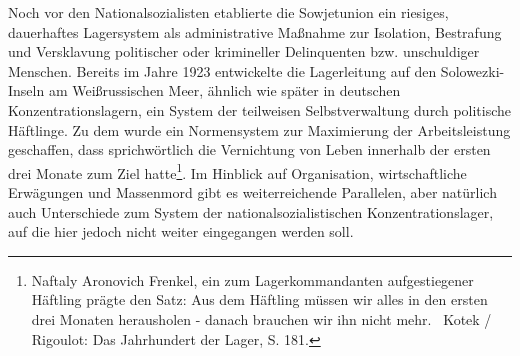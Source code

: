 Noch vor den Nationalsozialisten etablierte die Sowjetunion ein riesiges, dauerhaftes Lagersystem als administrative Maßnahme zur Isolation, Bestrafung und Versklavung politischer oder krimineller Delinquenten bzw. unschuldiger Menschen. Bereits im Jahre 1923 entwickelte die Lagerleitung auf den Solowezki-Inseln am Weißrussischen Meer, ähnlich wie später in deutschen Konzentrationslagern, ein System der teilweisen Selbstverwaltung durch politische Häftlinge. Zu dem wurde ein Normensystem zur Maximierung der Arbeitsleistung geschaffen, dass sprichwörtlich die Vernichtung von Leben innerhalb der ersten drei Monate zum Ziel hatte\footnote{Naftaly Aronovich Frenkel, ein zum Lagerkommandanten aufgestiegener Häftling prägte den Satz: \glqq Aus dem Häftling müssen wir alles in den ersten drei Monaten herausholen - danach brauchen wir ihn nicht mehr.\grqq~ Kotek / Rigoulot: Das Jahrhundert der Lager, S. 181.}. Im Hinblick auf  Organisation, wirtschaftliche Erwägungen und Massenmord gibt es weiterreichende Parallelen, aber natürlich auch Unterschiede zum System der nationalsozialistischen Konzentrationslager, auf die hier jedoch nicht weiter eingegangen werden soll.

